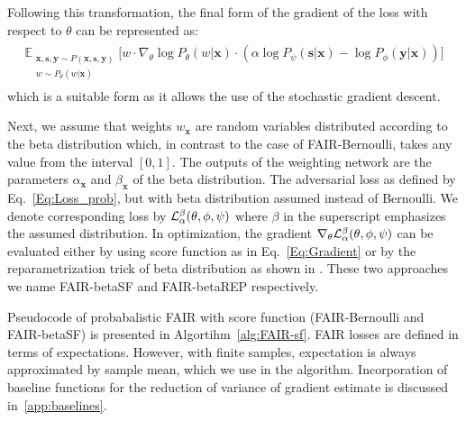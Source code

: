 \documentclass[preprint,12pt]{elsarticle}
\begin{document}
Following this transformation, the final form of the gradient of the loss with respect to $\theta$ can be represented as:
\begin{align}
\label{Eq:Gradient}
\begin{split}
\mathbb{E}_{\substack{\mathbf{x}, \mathbf{s}, \mathbf{y}\sim P(\mathbf{x},\mathbf{s}, \mathbf{y})\\w \sim P_\theta(w|\mathbf{x})}} \Big[w\cdot \nabla_{\theta}  \log P_\theta(w|\mathbf{x}) \cdot (\alpha\log P_\psi(\mathbf{s}|\mathbf{x}) - \log P_\phi(\mathbf{y}|\mathbf{x})) \Big]
\end{split}
\end{align}
which is a suitable form as it allows the use of the stochastic gradient descent.

Next, we assume that weights $w_\mathbf{x}$ are random variables distributed according to the beta distribution which, in contrast to the case of FAIR-Bernoulli, takes any value from the interval $[0,1]$. The outputs of the weighting network are the parameters $\alpha_\mathbf{x}$ and $\beta_\mathbf{x}$ of the beta distribution. The adversarial loss as defined by Eq.~\ref{Eq:Loss_prob}, but with beta distribution assumed instead of Bernoulli. We denote corresponding loss by ${\cal L}^\beta_\alpha(\theta,\phi,\psi)$ where $\beta$ in the superscript emphasizes the assumed distribution. In optimization, the gradient $\nabla_{\theta}{\cal L}^\beta_{\alpha}(\theta, \phi, \psi)$
can be evaluated either by using score function as in Eq.~\ref{Eq:Gradient} or by the reparametrization trick of beta distribution as shown in \cite{shah2015empirical}. These two approaches we name FAIR-betaSF and FAIR-betaREP respectively.

Pseudocode of probabalistic FAIR with score function (FAIR-Bernoulli and FAIR-betaSF) is presented in Algortihm~\ref{alg:FAIR-sf}. FAIR losses are defined in terms of expectations. However, with finite samples, expectation is always approximated by sample mean, which we use in the algorithm. Incorporation of baseline functions for the reduction of variance of gradient estimate is discussed in~\ref{app:baselines}.
\end{document}
